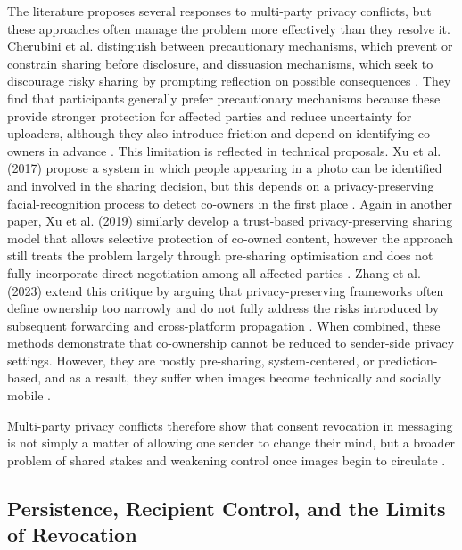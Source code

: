 The literature proposes several responses to multi-party privacy conflicts, but these approaches often manage the problem more effectively than they resolve it. Cherubini et al. distinguish between precautionary mechanisms, which prevent or constrain sharing before disclosure, and dissuasion mechanisms, which seek to discourage risky sharing by prompting reflection on possible consequences \cite{cherubini_2021}. They find that participants generally prefer precautionary mechanisms because these provide stronger protection for affected parties and reduce uncertainty for uploaders, although they also introduce friction and depend on identifying co-owners in advance \cite{cherubini_2021}. This limitation is reflected in technical proposals. Xu et al. (2017) propose a system in which people appearing in a photo can be identified and involved in the sharing decision, but this depends on a privacy-preserving facial-recognition process to detect co-owners in the first place \cite{xu_my_2017}. Again in another paper, Xu et al. (2019) similarly develop a trust-based privacy-preserving sharing model that allows selective protection of co-owned content, however the approach still treats the problem largely through pre-sharing optimisation and does not fully incorporate direct negotiation among all affected parties \cite{xu_trust-based_2019}. Zhang et al. (2023) extend this critique by arguing that privacy-preserving frameworks often define ownership too narrowly and do not fully address the risks introduced by subsequent forwarding and cross-platform propagation \cite{zhang_go-sharing_2023}. 
When combined, these methods demonstrate that co-ownership cannot be reduced to sender-side privacy settings. However, they are mostly pre-sharing, system-centered, or prediction-based, and as a result, they suffer when images become technically and socially mobile \cite{cherubini_2021, xu_my_2017, xu_trust-based_2019, zhang_go-sharing_2023}.

Multi-party privacy conflicts therefore show that consent revocation in messaging is not simply a matter of allowing one sender to change their mind, but a broader problem of shared stakes and weakening control once images begin to circulate \cite{cherubini_2021, zhang_go-sharing_2023}.

\subsection{Persistence, Recipient Control, and the Limits of Revocation}

